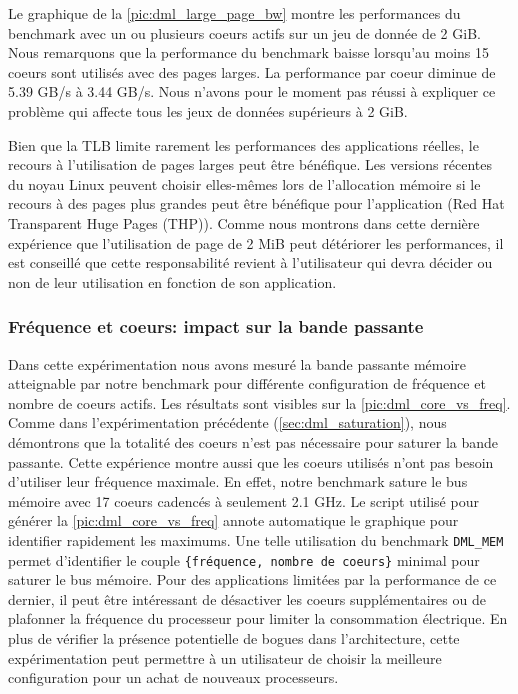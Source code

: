     Le graphique de la \autoref{pic:dml_large_page_bw} montre les performances du benchmark avec un ou plusieurs coeurs actifs sur un jeu de donnée de 2 GiB. Nous remarquons que la performance du benchmark baisse lorsqu’au moins 15 coeurs sont utilisés avec des pages larges. La performance par coeur diminue de 5.39 GB/s à 3.44 GB/s. Nous n'avons pour le moment pas réussi à expliquer ce problème qui affecte tous les jeux de données supérieurs à 2 GiB.
    
    Bien que la TLB limite rarement les performances des applications réelles, le recours à l'utilisation de pages larges peut être bénéfique. Les versions récentes du noyau Linux peuvent choisir elles-mêmes lors de l'allocation mémoire si le recours à des pages plus grandes peut être bénéfique pour l'application (Red Hat Transparent Huge Pages (THP)). Comme nous montrons dans cette dernière expérience que l'utilisation de page de 2 MiB peut détériorer les performances, il est conseillé que cette responsabilité revient à l'utilisateur qui devra décider ou non de leur utilisation en fonction de son application. 
  


    
    \subsubsection{Fréquence et coeurs: impact sur la bande passante} \label{sec:dml_core_vs_freq}
    
    Dans cette expérimentation nous avons mesuré la bande passante mémoire atteignable par notre benchmark pour différente configuration de fréquence et nombre de coeurs actifs. Les résultats sont visibles sur la \autoref{pic:dml_core_vs_freq}. Comme dans l'expérimentation précédente (\autoref{sec:dml_saturation}), nous démontrons que la totalité des coeurs n'est pas nécessaire pour saturer la bande passante. Cette expérience montre aussi que les coeurs utilisés n'ont pas besoin d'utiliser leur fréquence maximale. En effet, notre benchmark sature le bus mémoire avec 17 coeurs cadencés à seulement 2.1 GHz. Le script utilisé pour générer la \autoref{pic:dml_core_vs_freq} annote automatique le graphique pour identifier rapidement les maximums. Une telle utilisation du benchmark \verb=DML_MEM= permet d'identifier le couple  \verb|{fréquence, nombre de coeurs}| minimal pour saturer le bus mémoire. Pour des applications limitées par la performance de ce dernier, il peut être intéressant de désactiver les coeurs supplémentaires ou de plafonner la fréquence du processeur pour limiter la consommation électrique. En plus de vérifier la présence potentielle de bogues dans l'architecture, cette expérimentation peut permettre à un utilisateur de choisir la meilleure configuration pour un achat de nouveaux processeurs. 
    
